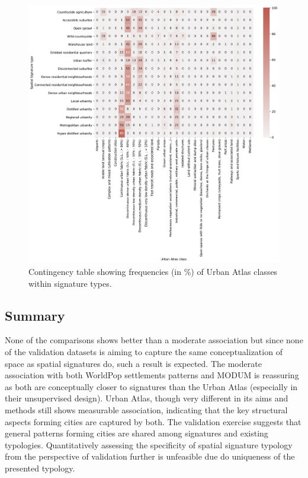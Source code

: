 \begin{figure}
    \centering
    \includegraphics[width=\linewidth]{fig/crosstab_ua.pdf}
    \caption{Contingency table showing frequencies (in \%) of Urban Atlas classes within signature types.}
    \label{}
\end{figure}

\subsection*{Summary}
None of the comparisons shows better than a moderate association but since none of the
validation datasets is aiming to capture the same conceptualization of space as spatial
signatures do, such a result is expected. The moderate association with both WorldPop
settlements patterns and MODUM is reassuring as both are conceptually closer to
signatures than the Urban Atlas (especially in their unsupervised design). Urban Atlas,
though very different in its aims and methods still shows measurable association,
indicating that the key structural aspects forming cities are captured by both. The
validation exercise suggests that general patterns forming cities are shared among
signatures and existing typologies. Quantitatively assessing the specificity of spatial
signature typology from the perspective of validation further is unfeasible due do
uniqueness of the presented typology.
